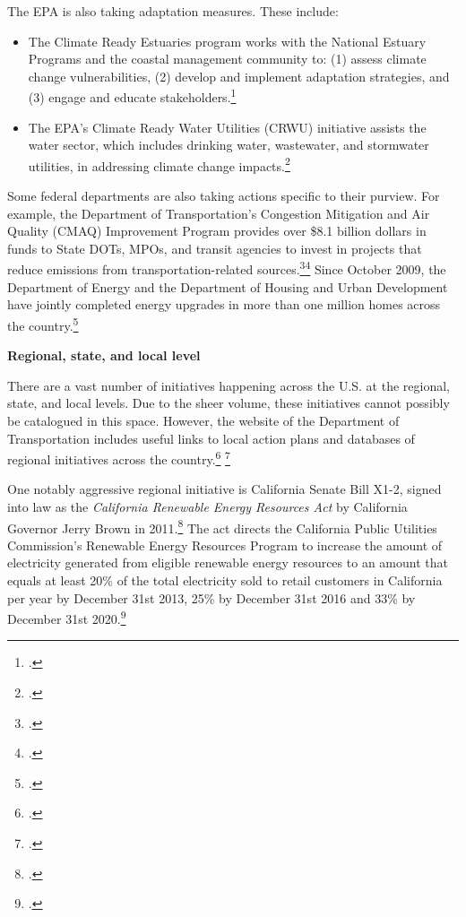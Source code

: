 The EPA is also taking adaptation measures. These include:	
\begin{itemize}
	\item The Climate Ready Estuaries program works with the National Estuary Programs and the coastal management community to: (1) assess climate change vulnerabilities, (2) develop and implement adaptation strategies, and (3) engage and educate stakeholders.\footcite[][]{EPAwater} 
	\item The EPA's Climate Ready Water Utilities (CRWU) initiative assists the water sector, which includes drinking water, wastewater, and stormwater utilities, in addressing climate change impacts.\footcite[][]{EPAwaterutilities}
\end{itemize}
	
	

Some federal departments are also taking actions specific to their purview. For example, the Department of Transportation’s Congestion Mitigation and Air Quality (CMAQ) Improvement Program provides over \$8.1 billion dollars in funds to State DOTs, MPOs, and transit agencies to invest in projects that reduce emissions from transportation-related sources.\footcite[][]{CMAQ}\footcite[][]{CMAQProgram} Since October 2009, the Department of Energy and the Department of Housing and Urban Development have jointly completed energy upgrades in more than one million homes across the country.\footcite[][]{WHenergy}



\textbf{Regional, state, and local level}



There are a vast number of initiatives happening across the U.S. at the regional, state, and local levels. 
Due to the sheer volume, these initiatives cannot possibly be catalogued in this space. 
However, the website of the Department of Transportation includes useful links to local action plans and databases of regional initiatives across the country.\footcite[][]{USDTaction} \footcite[][]{USDTinitiatives}



One notably aggressive regional initiative is California Senate Bill X1-2, signed into law as the \emph{California Renewable Energy Resources Act} by California Governor Jerry Brown in 2011.\footcite[][]{CaliSBX12}
The act directs the California Public Utilities Commission's Renewable Energy Resources Program to increase the amount of electricity generated from eligible renewable energy resources to an amount that equals at least 20\% of the total electricity sold to retail customers in California per year by December 31st 2013, 25\% by December 31st 2016 and 33\% by December 31st 2020.\footcite[][]{CaliforniaRenewableOverview}



